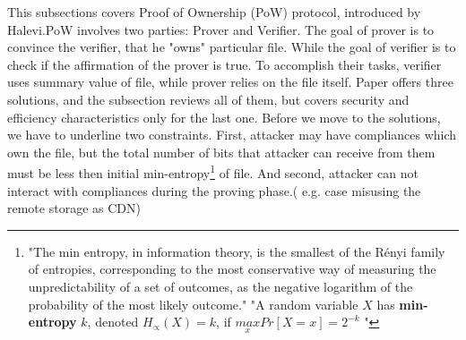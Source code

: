 \documentclass[12pt]{article}
\begin{document}
This subsections covers Proof of Ownership (PoW) protocol, introduced by Halevi.\cite{PoW}PoW involves two parties: Prover and Verifier. The goal of prover is to convince the verifier, that he "owns" particular file. While the goal of verifier is to check if the affirmation of the prover is true. To accomplish their tasks, verifier uses summary value of file, while  prover relies on  the file itself. Paper \cite{PoW} offers three solutions, and the subsection reviews all of them, but covers security and efficiency characteristics only  for the last one. Before we move to the solutions, we have to underline two constraints. First, attacker may have compliances which own the file, but the total number of bits that attacker can receive from them must be less then initial min-entropy\footnote{"The min entropy, in information theory, is the smallest of the Rényi family of entropies, corresponding to the most conservative way of measuring the unpredictability of a set of outcomes, as the negative logarithm of the probability of the most likely outcome." "A random variable $X$ has \textbf{min-entropy} $k$, denoted $H_\propto(X)=k$, if  $\underset{x}{max}Pr[X=x]=2^{-k}$  "\cite{MinEnt} } of file. And second, attacker can not interact with compliances during the proving phase.( e.g. case misusing the remote storage as CDN)
\end{document}
